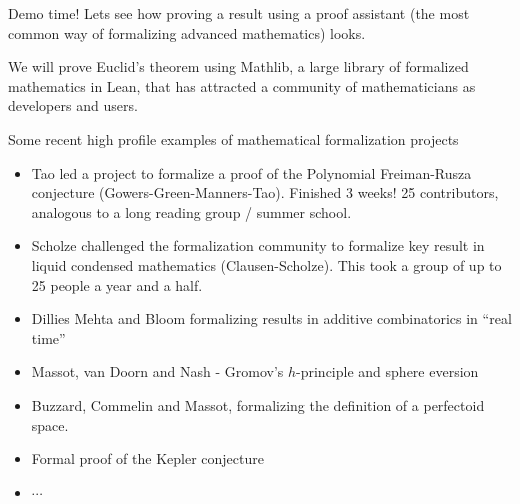 \documentclass{beamer}
\theoremstyle{plain}
\begin{document}
\begin{frame}{Demo time!}
    Lets see how proving a result using a proof assistant (the most common way of formalizing advanced mathematics) looks.

    We will prove Euclid's theorem using Mathlib, a large library of formalized mathematics in Lean, that has attracted a community of mathematicians as developers and users.
\end{frame}

\begin{frame}{Some recent high profile examples of mathematical formalization projects}
    \begin{itemize}
        \item Tao led a project to formalize a proof of  the Polynomial Freiman-Rusza conjecture (Gowers-Green-Manners-Tao).
            Finished 3 weeks! 25 contributors, analogous to a long reading group / summer school.
        \item Scholze challenged the formalization community to formalize 
            key result in liquid condensed mathematics (Clausen-Scholze). This took a group of up to 25 people a year and a half. 
        \item Dillies Mehta and Bloom formalizing results in additive combinatorics in ``real time'' %
        \item Massot, van Doorn and Nash - Gromov's $h$-principle and sphere eversion
        \item Buzzard, Commelin and Massot, formalizing the definition of a perfectoid space.
        \item Formal proof of the Kepler conjecture
        \item $\cdots$
    \end{itemize}
\end{frame}

\end{document}

